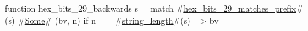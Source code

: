 function hex_bits_29_backwards s =
  match #\hyperref[sailRISCVzhexzybitszy29zymatcheszyprefix]{hex\_bits\_29\_matches\_prefix}#(s) {
      #\hyperref[sailRISCVzSome]{Some}# (bv, n) if n == #\hyperref[sailRISCVzstringzylength]{string\_length}#(s) => bv
  }
